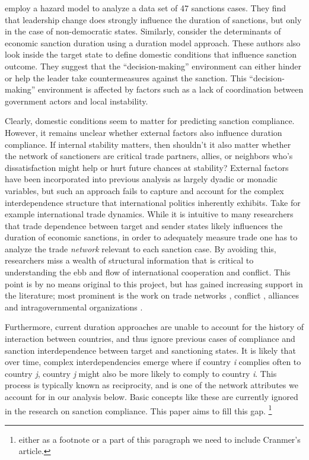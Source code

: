 \cite{mcgillivray2004} employ a hazard model to analyze a data set of 47 sanctions cases. They find that leadership change does strongly influence the duration of sanctions, but only in the case of non-democratic states. Similarly, \cite{bolks2000} consider the determinants of economic sanction duration using a duration model approach. These authors also look inside the target state to define domestic conditions that influence sanction outcome. They suggest that the ``decision-making'' environment can either hinder or help the leader take countermeasures against the sanction. This ``decision-making'' environment is affected by factors such as a lack of coordination between government actors and local instability. 

Clearly, domestic conditions seem to matter for predicting sanction compliance. However, it remains unclear whether external factors also influence duration compliance. If internal stability matters, then shouldn't it also matter whether the network of sanctioners are critical trade partners, allies, or neighbors who's dissatisfaction might help or hurt future chances at stability? External factors have been incorporated into previous analysis as largely dyadic or monadic variables, but such an approach fails to capture and account for the complex interdependence structure that international politics inherently exhibits. Take for example international trade dynamics. While it is intuitive to many researchers that trade dependence between target and sender states likely influences the duration of economic sanctions, in order to adequately measure trade one has to analyze the trade \textit{network} relevant to each sanction case. By avoiding this, researchers miss a wealth of structural information that is critical to understanding the ebb and flow of international cooperation and conflict. This point is by no means original to this project, but has gained increasing support in the literature; most prominent is the work on trade networks\citep{hoff2004modeling} , conflict \citep{dorff2013}, alliances \citep{warren2010geometry} and intragovernmental organizations \citep{cao2009networks,greenhill2010norm}. 

Furthermore, current duration approaches are unable to account for the history of interaction between countries, and thus ignore previous cases of compliance and sanction interdependence between target and sanctioning states. It is likely that over time, complex interdependencies emerge where if country \textit{i} complies often to country \textit{j}, country \textit{j} might also be more likely to comply to country \textit{i}. This process is typically known as reciprocity, and is one of the network attributes we account for in our analysis below. Basic concepts like these are currently ignored in the research on sanction compliance. This paper aims to fill this gap. \footnote{either as a footnote or a part of this paragraph we need to include Cranmer's article.} 


